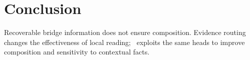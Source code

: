 \section{Conclusion}\label{sec:conclusion}
Recoverable bridge information does not ensure composition. Evidence routing changes the effectiveness of local reading; \method\ exploits the same heads to improve composition and sensitivity to contextual facts.
